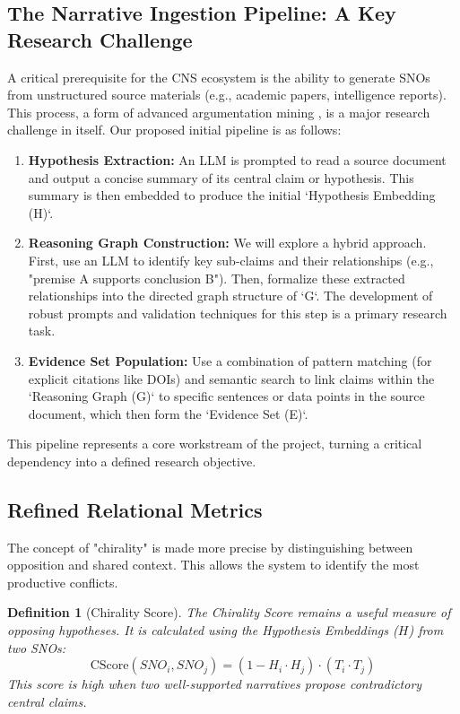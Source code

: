 \documentclass[12pt, a4paper]{article}
\newtheorem{definition}{Definition}[section]
\begin{document}
\subsection{The Narrative Ingestion Pipeline: A Key Research Challenge}
A critical prerequisite for the CNS ecosystem is the ability to generate SNOs from unstructured source materials (e.g., academic papers, intelligence reports). This process, a form of advanced argumentation mining \cite{Lippi2016ArgMining}, is a major research challenge in itself. Our proposed initial pipeline is as follows:
\begin{enumerate}
    \item \textbf{Hypothesis Extraction:} An LLM is prompted to read a source document and output a concise summary of its central claim or hypothesis. This summary is then embedded to produce the initial `Hypothesis Embedding (H)`.
    \item \textbf{Reasoning Graph Construction:} We will explore a hybrid approach. First, use an LLM to identify key sub-claims and their relationships (e.g., "premise A supports conclusion B"). Then, formalize these extracted relationships into the directed graph structure of `G`. The development of robust prompts and validation techniques for this step is a primary research task.
    \item \textbf{Evidence Set Population:} Use a combination of pattern matching (for explicit citations like DOIs) and semantic search to link claims within the `Reasoning Graph (G)` to specific sentences or data points in the source document, which then form the `Evidence Set (E)`.
\end{enumerate}
This pipeline represents a core workstream of the project, turning a critical dependency into a defined research objective.


\subsection{Refined Relational Metrics}
The concept of "chirality" is made more precise by distinguishing between opposition and shared context. This allows the system to identify the most productive conflicts.

\begin{definition}[Chirality Score]
The Chirality Score remains a useful measure of opposing \textit{hypotheses}. It is calculated using the Hypothesis Embeddings ($H$) from two SNOs:
\[
\text{CScore}(SNO_i, SNO_j) = (1 - H_i \cdot H_j) \cdot (T_i \cdot T_j)
\]
This score is high when two well-supported narratives propose contradictory central claims.
\end{definition}
\end{document}
